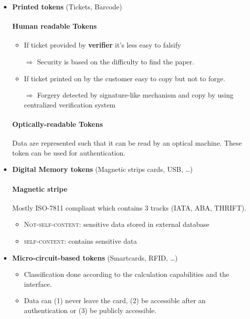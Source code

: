 \begin{itemize}
    \item \textbf{Printed tokens} (Tickets, Barcode)
        \paragraph{Human readable Tokens}
       \label{par:humanreadableTokens}

        \begin{itemize}
            \item If ticket provided by \textbf{verifier} it's less easy to
                falsify 
                
                $\Rightarrow$ Security is based on the difficulty to
                find the paper.

            \item If ticket printed on by the customer easy to copy but
                not to forge.

                $\Rightarrow$ Forgery detected by signature-like
                mechanism and
                copy by using centralized verification system
        \end{itemize}

        \paragraph{Optically-readable Tokens}

        Data are represented such that it can be read by an optical
        machine. These token can be used for authentication.

    \item \textbf{Digital Memory tokens} (Magnetic strips cards, USB, \ldots)
        \paragraph{Magnetic stripe} Mostly \textsc{ISO-7811} compliant
        which contains 3 tracks (IATA, ABA, THRIFT).
        \begin{itemize}
            \item \textsc{Not-self-content}: sensitive data stored in
                external database
            \item \textsc{self-content}: contains sensitive data
        \end{itemize}

    \item \textbf{Micro-circuit-based tokens}  (Smartcards, RFID, \ldots)
        \begin{itemize}
            \item Classification done according to the
                calculation capabilities and the interface.
            \item Data can (1) never leave the card, (2) be accessible after an
                authentication or (3) be publicly accessible.
        \end{itemize}

\end{itemize}
